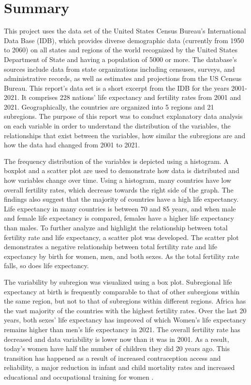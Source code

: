 \documentclass[12 pt]{scrartcl}
\begin{document}
\section{Summary}

This project uses the data set of the United States Census Bureau's International Data Base (IDB), which provides diverse demographic data (currently from 1950 to 2060) on all states and regions of the world recognized by the United States Department of State and having a population of 5000 or more. The database's sources include data from state organizations including censuses, surveys, and administrative records, as well as estimates and projections from the US Census Bureau. This report's data set is a short excerpt from the IDB for the years 2001-2021. It comprises 228 nations' life expectancy and fertility rates from 2001 and 2021. Geographically, the countries are organized into 5 regions and 21 subregions. The purpose of this report was to conduct explanatory data analysis on each variable in order to understand the distribution of the variables, the relationships that exist between the variables, how similar the subregions are and how the data had changed from 2001 to 2021.

The frequency distribution of the variables is depicted using a histogram. A boxplot and a scatter plot are used to demonstrate how data is distributed and how variables change over time. Using a histogram, many countries have low overall fertility rates, which decrease towards the right side of the graph. The findings also suggest that the majority of countries have a high life expectancy. Life expectancy in many countries is between 70 and 85 years, and when male and female life expectancy is compared, females have a higher life expectancy than males. To further analyze and highlight the relationship between total fertility rate and life expectancy, a scatter plot was developed. The scatter plot demonstrates a negative relationship between total fertility rate and life expectancy by birth for women, men, and both sexes. As the total fertility rate falls, so does life expectancy.

The variability by subregion was visualized using a box plot. Subregional life expectancy at birth is frequently comparable to that of other subregions within the same region, but not to that of subregions within different regions. Africa has the vast majority of the countries with the highest fertility rates. Over the last 20 years, both sexes' life expectancy has improved of which Women's life expectancy remains higher than men's life expectancy in 2021. The overall fertility rate has decreased and data variability is lower now than it was in 2001. As a result, today's women have half the number of children they did 20 years ago. This transition has happened as a result of increased contraception access and reliability, a major reduction in infant and child mortality rates and increased educational and occupational training for women \citep{Fertility}.
\end{document}
